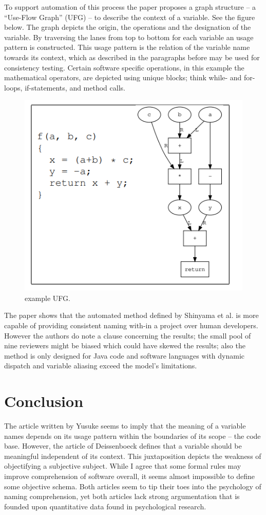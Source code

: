 \documentclass[a4paper,12pt]{article}
\begin{document}
To support automation of this process the paper proposes a graph structure -- a “Use-Flow Graph” (UFG) -- to describe the context of a variable. See the figure below. The graph depicts the origin, the operations and the designation of the variable. By traversing the lanes from top to bottom for each variable an usage pattern is constructed. This usage pattern is the relation of the variable name towards its context, which as described in the paragraphs before may be used for consistency testing. Certain software specific operations, in this example the mathematical operators, are depicted using unique blocks; think while- and for-loops, if-statements, and method calls. 

\begin{figure}[ht]
    \centering
    \includegraphics[width=0.7\linewidth]{ufg}
    \caption{example UFG.}
    \label{fig:ufg}
\end{figure}
\hfill
\FloatBarrier

    
The paper shows that the automated method defined by Shinyama et al. is more capable of providing consistent naming with-in a project over human developers. However the authors do note a clause concerning the results; the small pool of nine reviewers might be biased which could have skewed the results; also the method is only designed for Java code and software languages with dynamic dispatch and variable aliasing exceed the model's limitations.

\section{Conclusion}
The article written by Yusuke seems to imply that the meaning of a variable names depends on its usage pattern within the boundaries of its scope – the code base. However, the article of Deissenboeck defines that a variable should be meaningful independent of its context. This juxtaposition depicts the weakness of objectifying a subjective subject. While I agree that some formal rules may improve comprehension of software overall, it seems almost impossible to define some objective schema. Both articles seem to tip their toes into the psychology of naming comprehension, yet both articles lack strong argumentation that is founded upon quantitative data found in psychological research.
\end{document}
